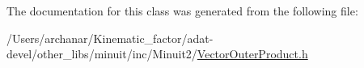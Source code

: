 The documentation for this class was generated from the following file\+:\begin{DoxyCompactItemize}
\item 
/\+Users/archanar/\+Kinematic\+\_\+factor/adat-\/devel/other\+\_\+libs/minuit/inc/\+Minuit2/\mbox{\hyperlink{adat-devel_2other__libs_2minuit_2inc_2Minuit2_2VectorOuterProduct_8h}{Vector\+Outer\+Product.\+h}}\end{DoxyCompactItemize}
